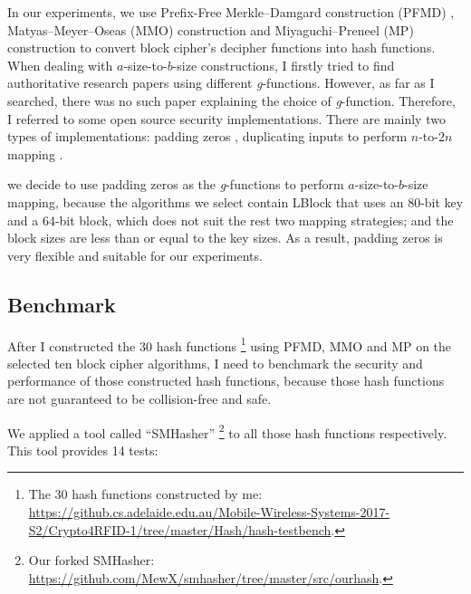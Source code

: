 \documentclass[sigconf, review=false]{acmart}
\begin{document}
In our experiments, we use Prefix-Free Merkle--Damgard construction (PFMD) \cite{mirvaziri2007collision}, Matyas--Meyer--Oseas (MMO) construction \cite{wikipedia2017one}
and Miyaguchi--Preneel (MP) construction \cite{wikipedia2017one} to convert block cipher's decipher functions into hash functions.
When dealing with $a$-size-to-$b$-size constructions, I firstly tried to find authoritative research papers using different \textit{g}-functions.
However, as far as I searched, there was no such paper explaining the choice of \textit{g}-function.
Therefore, I referred to some open source security implementations.
There are mainly two types of implementations: padding zeros \cite{naoyukimorita2017},
duplicating inputs to perform $n$-to-$2n$ mapping \cite{nikhilvarghese2017}.

we decide to use padding zeros as the \textit{g}-functions to perform $a$-size-to-$b$-size mapping,
because the algorithms we select contain LBlock that uses an 80-bit key and a 64-bit block,
which does not suit the rest two mapping strategies; and the block sizes are less than or equal to the key sizes.
As a result, padding zeros is very flexible and suitable for our experiments.


\subsection{Benchmark}
After I constructed the 30 hash functions \footnote{The 30 hash functions constructed by me: \url{https://github.cs.adelaide.edu.au/Mobile-Wireless-Systems-2017-S2/Crypto4RFID-1/tree/master/Hash/hash-testbench}.}
using PFMD, MMO and MP on the selected ten block cipher algorithms,
I need to benchmark the security and performance of those constructed hash functions,
because those hash functions are not guaranteed to be collision-free and safe.

We applied a tool called ``SMHasher'' \footnote{Our forked SMHasher: \url{https://github.com/MewX/smhasher/tree/master/src/ourhash}.}
to all those hash functions respectively.
This tool provides 14 tests:
\end{document}
